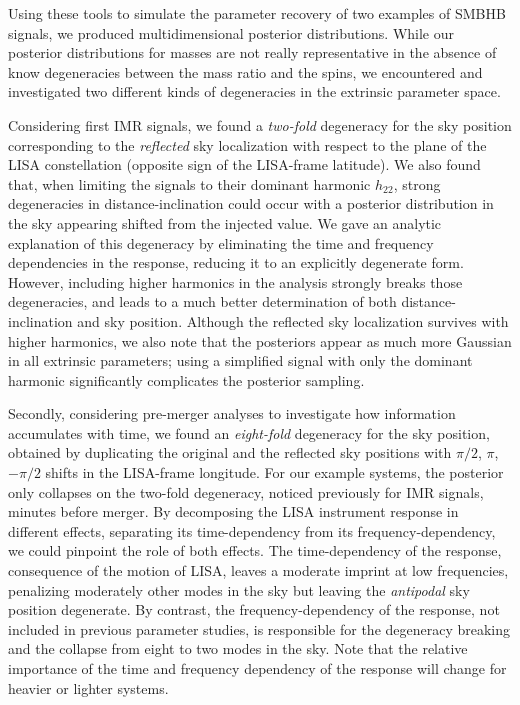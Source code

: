\documentclass[aps,showpacs,twocolumn,prd,superscriptaddress,nofootinbib]{revtex4-1}
\begin{document}
Using these tools to simulate the parameter recovery of two examples of SMBHB signals, we produced multidimensional posterior distributions. While our posterior distributions for masses are not really representative in the absence of know degeneracies between the mass ratio and the spins, we encountered and investigated two different kinds of degeneracies in the extrinsic parameter space.

Considering first IMR signals, we found a \textit{two-fold} degeneracy for the sky position corresponding to the \textit{reflected} sky localization with respect to the plane of the LISA constellation (opposite sign of the LISA-frame latitude). We also found that, when limiting the signals to their dominant harmonic $h_{22}$, strong degeneracies in distance-inclination could occur with a posterior distribution in the sky appearing shifted from the injected value. We gave an analytic explanation of this degeneracy by eliminating the time and frequency dependencies in the response, reducing it to an explicitly degenerate form. However, including higher harmonics in the analysis strongly breaks those degeneracies, and leads to a much better determination of both distance-inclination and sky position. Although the reflected sky localization survives with higher harmonics, we also note that the posteriors appear as much more Gaussian in all extrinsic parameters; using a simplified signal with only the dominant harmonic significantly complicates the posterior sampling.

Secondly, considering pre-merger analyses to investigate how information accumulates with time, we found an \textit{eight-fold} degeneracy for the sky position, obtained by duplicating the original and the reflected sky positions with $\pi/2$, $\pi$, $-\pi/2$ shifts in the LISA-frame longitude. For our example systems, the posterior only collapses on the two-fold degeneracy, noticed previously for IMR signals, minutes before merger. By decomposing the LISA instrument response in different effects, separating its time-dependency from its frequency-dependency, we could pinpoint the role of both effects. The time-dependency of the response, consequence of the motion of LISA, leaves a moderate imprint at low frequencies, penalizing moderately other modes in the sky but leaving the \textit{antipodal} sky position degenerate. By contrast, the frequency-dependency of the response, not included in previous parameter studies, is responsible for the degeneracy breaking and the collapse from eight to two modes in the sky. Note that the relative importance of the time and frequency dependency of the response will change for heavier or lighter systems.
\end{document}
